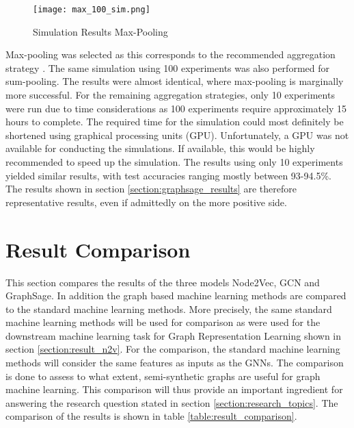   \begin{figure}[htbp!]
		\centering
		\texttt{[image: max\_100\_sim.png]}
		\caption{Simulation Results Max-Pooling}
        \label{fig:simulation_results}
  \end{figure}

  \noindent Max-pooling was selected as this corresponds to the recommended
  aggregation strategy \citep[p. 9]{hamilton2017inductive}. The same simulation
  using 100 experiments was also performed for sum-pooling. The results were
  almost identical, where max-pooling is marginally more successful. For the 
  remaining aggregation strategies, only 10 experiments were run due to time
  considerations as 100 experiments require approximately 15 hours to complete.
  The required time for the simulation could most definitely be shortened using
  graphical processing units (GPU). Unfortunately, a GPU was not available for
  conducting the simulations. If available, this would be highly recommended to
  speed up the simulation. The results using only 10 experiments yielded similar 
  results, with test accuracies ranging mostly between 93-94.5\%. The results 
  shown in section \ref{section:graphsage_results} are therefore representative 
  results, even if admittedly on the more positive side. 

  \section{Result Comparison}
  \label{section:result_comp}

  This section compares the results of the three models Node2Vec, GCN and
  GraphSage. In addition the graph based machine learning methods are compared
  to the standard machine learning methods. More precisely, the same standard
  machine learning methods will be used for comparison as were used for the
  downstream machine learning task for Graph Representation Learning shown in 
  section \ref{section:result_n2v}. For the comparison, the standard machine
  learning methods will consider the same features as inputs as the GNNs. The 
  comparison is done to assess to what extent, semi-synthetic graphs are useful
  for graph machine learning. This comparison will thus provide an important 
  ingredient for answering the research question stated in section 
  \ref{section:research_topics}. The comparison of the results is shown in table 
  \ref{table:result_comparison}.

